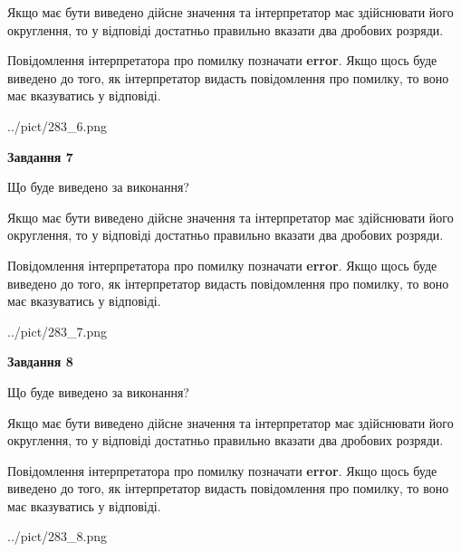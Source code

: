 \documentclass[12pt, ukrainian]{article}
\begin{document}
{\begin {Large}
Якщо має бути виведено дійсне значення та інтерпретатор має здійснювати його округлення, 
то у відповіді достатньо правильно вказати два дробових розряди.

Повідомлення інтерпретатора про помилку позначати \textbf{error}.
Якщо щось буде виведено до того, як інтерпретатор видасть повідомлення про помилку, 
то воно має вказуватись у відповіді. \par

\begin{center}
	{../pict/283_6.png}
\end{center}
\newpage

{\begin {center}\textbf{Завдання 7}\end {center}}\par
Що буде виведено за виконання? \par

Якщо має бути виведено дійсне значення та інтерпретатор має здійснювати його округлення, 
то у відповіді достатньо правильно вказати два дробових розряди.

Повідомлення інтерпретатора про помилку позначати \textbf{error}.
Якщо щось буде виведено до того, як інтерпретатор видасть повідомлення про помилку, 
то воно має вказуватись у відповіді. \par

\begin{center}
	{../pict/283_7.png}
\end{center}
\newpage

{\begin {center}\textbf{Завдання 8}\end {center}}\par
Що буде виведено за виконання? \par

Якщо має бути виведено дійсне значення та інтерпретатор має здійснювати його округлення, 
то у відповіді достатньо правильно вказати два дробових розряди.

Повідомлення інтерпретатора про помилку позначати \textbf{error}.
Якщо щось буде виведено до того, як інтерпретатор видасть повідомлення про помилку, 
то воно має вказуватись у відповіді. \par

\begin{center}
	{../pict/283_8.png}
\end{center}
\newpage


\end{Large}}
\end{document}
